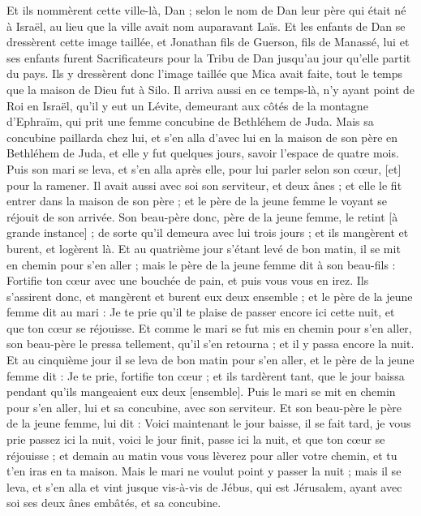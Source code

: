 \begin{multicols}{2}
Et ils nommèrent cette ville-là, Dan ; selon le nom de Dan leur père qui était né à Israël, au lieu que la ville avait nom auparavant Laïs.
Et les enfants de Dan se dressèrent cette image taillée, et Jonathan fils de Guerson, fils de Manassé, lui et ses enfants furent Sacrificateurs pour la Tribu de Dan jusqu'au jour qu'elle partit du pays.
Ils y dressèrent donc l'image taillée que Mica avait faite, tout le temps que la maison de Dieu fut à Silo.
\VerseOne{}Il arriva aussi en ce temps-là, n'y ayant point de Roi en Israël, qu'il y eut un Lévite, demeurant aux côtés de la montagne d'Ephraïm, qui prit une femme concubine de Bethléhem de Juda.
Mais sa concubine paillarda chez lui, et s'en alla d'avec lui en la maison de son père en Bethléhem de Juda, et elle y fut quelques jours, savoir l'espace de quatre mois.
Puis son mari se leva, et s'en alla après elle, pour lui parler selon son cœur, [et] pour la ramener. Il avait aussi avec soi son serviteur, et deux ânes ; et elle le fit entrer dans la maison de son père ; et le père de la jeune femme le voyant se réjouit de son arrivée.
Son beau-père donc, père de la jeune femme, le retint [à grande instance] ; de sorte qu'il demeura avec lui trois jours ; et ils mangèrent et burent, et logèrent là.
Et au quatrième jour s'étant levé de bon matin, il se mit en chemin pour s'en aller ; mais le père de la jeune femme dit à son beau-fils : Fortifie ton cœur avec une bouchée de pain, et puis vous vous en irez.
Ils s'assirent donc, et mangèrent et burent eux deux ensemble ; et le père de la jeune femme dit au mari : Je te prie qu'il te plaise de passer encore ici cette nuit, et que ton cœur se réjouisse.
Et comme le mari se fut mis en chemin pour s'en aller, son beau-père le pressa tellement, qu'il s'en retourna ; et il y passa encore la nuit.
Et au cinquième jour il se leva de bon matin pour s'en aller, et le père de la jeune femme dit : Je te prie, fortifie ton cœur ; et ils tardèrent tant, que le jour baissa pendant qu'ils mangeaient eux deux [ensemble].
Puis le mari se mit en chemin pour s'en aller, lui et sa concubine, avec son serviteur. Et son beau-père le père de la jeune femme, lui dit : Voici maintenant le jour baisse, il se fait tard, je vous prie passez ici la nuit, voici le jour finit, passe ici la nuit, et que ton cœur se réjouisse ; et demain au matin vous vous lèverez pour aller votre chemin, et tu t'en iras en ta maison.
Mais le mari ne voulut point y passer la nuit ; mais il se leva, et s'en alla et vint jusque vis-à-vis de Jébus, qui est Jérusalem, ayant avec soi ses deux ânes embâtés, et sa concubine.

\end{multicols}
